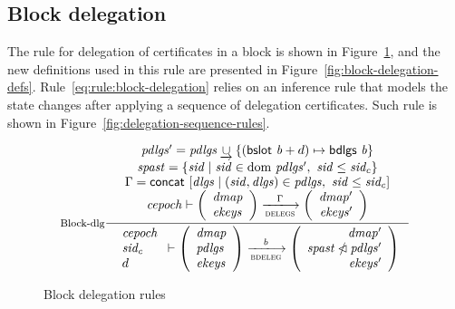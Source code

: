 \documentclass[11pt,a4paper]{article}
\DeclareMathOperator{\dom}{dom}
\newcommand{\restrictdom}{\lhd}
\newcommand{\subtractdom}{\mathbin{\slashed{\restrictdom}}}
\newcommand{\unionoverride}{\mathbin{\underrightarrow\cup}}
\newcommand{\var}[1]{\mathit{#1}}
\newcommand{\fun}[1]{\mathsf{#1}}
\newcommand{\trans}[2]{\xlongrightarrow[\textsc{#1}]{#2}}
\newcommand{\bslot}[1]{\fun{bslot}~\var{#1}}
\newcommand{\bdlgs}[1]{\fun{bdlgs}~\var{#1}}
\begin{document}
\subsection{Block delegation}
\label{sec:block-delegation}

The rule for delegation of certificates in a block is shown in
Figure~\ref{fig:block-delegation-rules}, and the new definitions used in this
rule are presented in Figure~\ref{fig:block-delegation-defs}.
Rule~\ref{eq:rule:block-delegation} relies on an inference rule that models the
state changes after applying a sequence of delegation certificates. Such rule
is shown in Figure~\ref{fig:delegation-sequence-rules}.

\begin{figure}
  \centering
  \begin{equation}
    \label{eq:rule:block-delegation}
    \inference[Block-dlg]
    {
      \var{pdlgs'} = \var{pdlgs} \unionoverride \{(\bslot{b} + d) \mapsto \bdlgs{b} \}\\
      \var{spast} = \{ \var{sid} \mid \var{sid} \in \var \dom ~ \var{pdlgs'}
                                    ,~ \var{sid} \leq \var{sid_c}\}\\
      \Gamma = \fun{concat}~ [ \var{dlgs} \mid (\var{sid}, \var{dlgs}) \in \var{pdlgs}
                                          ,~ \var{sid} \leq \var{sid_c}]\\
      \var{cepoch} \vdash
      {
        \left(
          \begin{array}{l}
            \var{dmap}\\
            \var{ekeys}
          \end{array}
        \right)
      }
      \trans{delegs}{\Gamma}
      {
        \left(
          \begin{array}{r}
            \var{dmap'}\\
            \var{ekeys'}
          \end{array}
        \right)
      }
    }
    {
      \begin{array}{l}
        \var{cepoch}\\
        \var{sid_c}\\
        d
      \end{array}
      \vdash
      {
        \left(
          \begin{array}{l}
            \var{dmap}\\
            \var{pdlgs}\\
            \var{ekeys}
          \end{array}
        \right)
      }
      \trans{bdeleg}{b}
      {
        \left(
          \begin{array}{r}
            \var{dmap'}\\
            \var{\var{spast} \subtractdom pdlgs'}\\
            \var{ekeys'}
          \end{array}
        \right)
      }
    }
  \end{equation}
  \caption{Block delegation rules}
  \label{fig:block-delegation-rules}
\end{figure}
\end{document}
